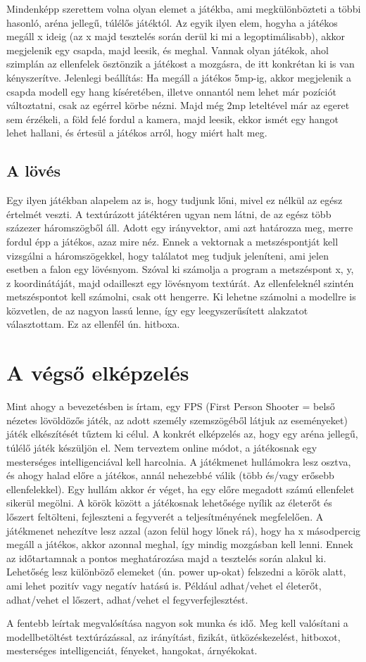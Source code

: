 Mindenképp szerettem volna olyan elemet a játékba, ami megkülönbözteti a többi hasonló, aréna jellegű, túlélős játéktól. Az egyik ilyen elem, hogyha a játékos megáll x ideig (az x majd tesztelés során derül ki mi a legoptimálisabb), akkor megjelenik egy csapda, majd leesik, és meghal. Vannak olyan játékok, ahol szimplán az ellenfelek ösztönzik a játékost a mozgásra, de itt konkrétan ki is van kényszerítve. Jelenlegi beállítás:
Ha megáll a játékos 5mp-ig, akkor megjelenik a csapda modell egy hang kíséretében, illetve onnantól nem lehet már pozíciót változtatni, csak az egérrel körbe nézni. Majd még 2mp leteltével már az egeret sem érzékeli, a föld felé fordul a kamera, majd leesik, ekkor ismét egy hangot lehet hallani, és értesül a játékos arról, hogy miért halt meg.

\subsection{A lövés}

Egy ilyen játékban alapelem az is, hogy tudjunk lőni, mivel ez nélkül az egész értelmét veszti. A textúrázott játéktéren ugyan nem látni, de az egész több százezer háromszögből áll. Adott egy irányvektor, ami azt határozza meg, merre fordul épp a játékos, azaz mire néz. Ennek a vektornak a metszéspontját kell vizsgálni a háromszögekkel, hogy találatot meg tudjuk jeleníteni, ami jelen esetben a falon egy lövésnyom. Szóval ki számolja a program a metszéspont x, y, z koordinátáját, majd odailleszt egy lövésnyom textúrát. Az ellenfeleknél szintén metszéspontot kell számolni, csak ott hengerre. Ki lehetne számolni a modellre is közvetlen, de az nagyon lassú lenne, így egy leegyszerűsített alakzatot választottam. Ez az ellenfél ún. hitboxa.

\section{A végső elképzelés}

Mint ahogy a bevezetésben is írtam, egy FPS (First Person Shooter = belső nézetes lövöldözős játék, az adott személy szemszögéből látjuk az eseményeket) játék elkészítését tűztem ki célul. A konkrét elképzelés az, hogy egy aréna jellegű, túlélő játék készüljön el. Nem terveztem online módot, a játékosnak egy mesterséges intelligenciával kell harcolnia. A játékmenet hullámokra lesz osztva, és ahogy halad előre a játékos, annál nehezebbé válik (több és/vagy erősebb ellenfelekkel). Egy hullám akkor ér véget, ha egy előre megadott számú ellenfelet sikerül megölni. A körök között a játékosnak lehetősége nyílik az életerőt és lőszert feltölteni, fejleszteni a fegyverét a teljesítményének megfelelően. A játékmenet nehezítve lesz azzal (azon felül hogy lőnek rá), hogy ha x másodpercig megáll a játékos, akkor azonnal meghal, így mindig mozgásban kell lenni. Ennek az időtartamnak a pontos meghatározása majd a tesztelés során alakul ki. Lehetőség lesz különböző elemeket (ún. power up-okat) felszedni a körök alatt, ami lehet pozitív vagy negatív hatású is. Például adhat/vehet el életerőt, adhat/vehet el lőszert, adhat/vehet el fegyverfejlesztést.

A fentebb leírtak megvalósítása nagyon sok munka és idő. Meg kell valósítani a modellbetöltést textúrázással, az irányítást, fizikát, ütközéskezelést, hitboxot, mesterséges intelligenciát, fényeket, hangokat, árnyékokat.
